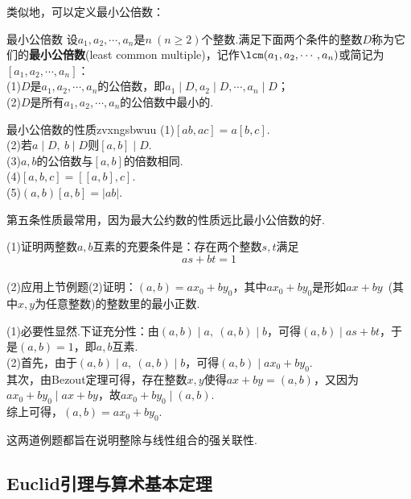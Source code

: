 类似地，可以定义最小公倍数：

\begin{definition}{最小公倍数}
	设$a_1,a_2, \cdots ,a_n$是$n~(n \geq 2)$个整数.满足下面两个条件的整数$D$称为它们的\textbf{最小公倍数}(least common multiple)，记作$\lcm (a_1,a_2, \cdots ,a_n)$或简记为$[a_1,a_2, \cdots ,a_n]$： \\
	(1)$D$是$a_1,a_2, \cdots ,a_n$的公倍数，即$a_1 \mid D,a_2 \mid D, \cdots ,a_n \mid D$； \\
	(2)$D$是所有$a_1,a_2, \cdots ,a_n$的公倍数中最小的.
\end{definition}

\begin{theorem}{最小公倍数的性质}{zvxngsbwuu}
	(1)$[ab,ac]=a[b,c]$. \\
	(2)若$a \mid D,~b \mid D$则$[a,b] \mid D$. \\
	(3)$a,b$的公倍数与$[a,b]$的倍数相同. \\
	(4)$[a,b,c]=[[a,b],c]$. \\
	(5)$(a,b)[a,b]=|ab|$.
\end{theorem}
\begin{remark}
	第五条性质最常用，因为最大公约数的性质远比最小公倍数的好.
\end{remark}

\begin{example} %
	(1)证明两整数$a,b$互素的充要条件是：存在两个整数$s,t$满足$$as+bt=1$$ \\
	(2)应用上节例题(2)证明：$(a,b)=ax_0+by_0$，其中$ax_0+by_0$是形如$ax+by$~(其中$x,y$为任意整数)的整数里的最小正数.
\end{example}
\begin{solution}
	(1)必要性显然.下证充分性：由$(a,b) \mid a,~(a,b) \mid b$，可得$(a,b) \mid as+bt$，于是$(a,b)=1$，即$a,b$互素. \\
	(2)首先，由于$(a,b) \mid a,~(a,b) \mid b$，可得$(a,b) \mid ax_0+by_0$. \\
	其次，由Bezout定理可得，存在整数$x,y$使得$ax+by = (a,b)$，又因为$ax_0 + by_0 \mid ax+by$，故$ax_0 + by_0 \mid (a,b)$. \\
	综上可得，$(a,b)=ax_0+by_0$.
\end{solution}
\begin{remark}
	这两道例题都旨在说明整除与线性组合的强关联性.
\end{remark}

\subsection{Euclid引理与算术基本定理}

